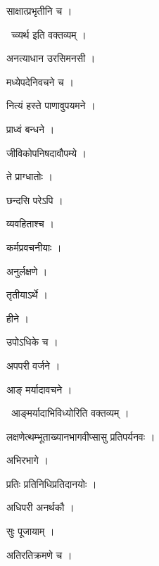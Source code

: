 \documentclass[10pt, openany, oneside]{book}
\begin{document}
\noindent साक्षात्प्रभृतीनि च ।

\par\noindent\hspace{1.5em}{\vps वा॰}~{\qt च्व्यर्थ इति वक्तव्यम् ।}

\noindent अनत्याधान उरसिमनसी ।

\noindent मध्येपदेनिवचने च ।

\noindent नित्यं हस्ते पाणावुपयमने ।

\noindent प्राध्वं बन्धने ।

\noindent जीविकोपनिषदावौपम्ये ।

\noindent ते प्राग्धातोः ।

\noindent छन्दसि परेऽपि ।

\noindent व्यवहिताश्च ।

\noindent कर्मप्रवचनीयाः ।

\noindent अनुर्लक्षणे ।

\noindent तृतीयाऽर्थे ।

\noindent हीने ।

\noindent उपोऽधिके च ।

\noindent अपपरी वर्जने ।

\noindent आङ् मर्यादावचने ।

\par\noindent\hspace{1.5em}{\vps वा॰}~{\qt आङ्मर्यादाभिविध्योरिति वक्तव्यम् ।}

\noindent लक्षणेत्थम्भूताख्यानभागवीप्सासु प्रतिपर्यनवः ।

\noindent अभिरभागे ।

\noindent प्रतिः प्रतिनिधिप्रतिदानयोः ।

\noindent अधिपरी अनर्थकौ ।

\noindent सुः पूजायाम् ।

\noindent अतिरतिक्रमणे च ।
\end{document}
